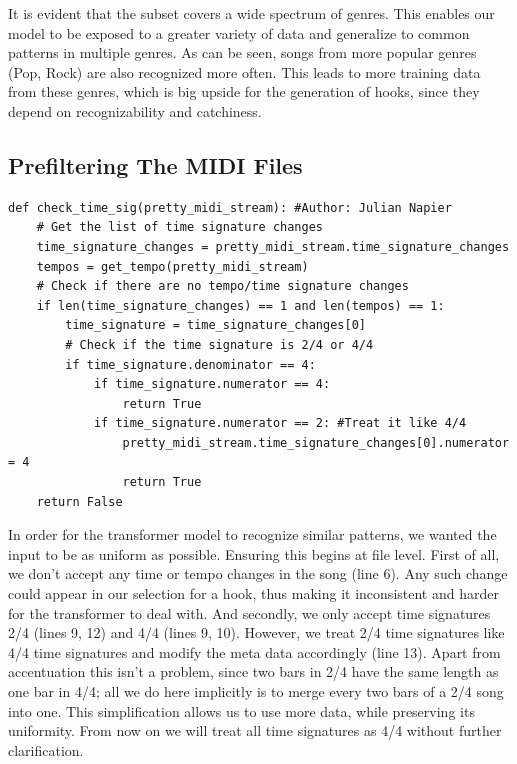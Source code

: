 \documentclass[a4paper,12pt]{extarticle}
\begin{document}
\vspace{0.1cm}
\raggedright It is evident that the subset covers a wide spectrum of genres. This enables our model to be exposed to a greater variety of data and generalize to common patterns in multiple genres. As can be seen, songs from more popular genres (Pop, Rock) are also recognized more often. This leads to more training data from these genres, which is big upside for the generation of hooks, since they depend on recognizability and catchiness.

\subsection{Prefiltering The MIDI Files}
\begin{lstlisting}
def check_time_sig(pretty_midi_stream): #Author: Julian Napier
    # Get the list of time signature changes
    time_signature_changes = pretty_midi_stream.time_signature_changes
    tempos = get_tempo(pretty_midi_stream)
    # Check if there are no tempo/time signature changes
    if len(time_signature_changes) == 1 and len(tempos) == 1:
        time_signature = time_signature_changes[0]
        # Check if the time signature is 2/4 or 4/4
        if time_signature.denominator == 4:
            if time_signature.numerator == 4:
                return True
            if time_signature.numerator == 2: #Treat it like 4/4
                pretty_midi_stream.time_signature_changes[0].numerator = 4
                return True
    return False
\end{lstlisting}
\vspace{0.2cm}
In order for the transformer model to recognize similar patterns, we wanted the input to be as uniform as possible. Ensuring this begins at file level. First of all, we don't accept any time or tempo changes in the song (line 6). Any such change could appear in our selection for a hook, thus making it inconsistent and harder for the transformer to deal with. And secondly, we only accept time signatures 2/4 (lines 9, 12) and 4/4 (lines 9, 10). However, we treat 2/4 time signatures like 4/4 time signatures and modify the meta data accordingly (line 13). Apart from accentuation this isn't a problem, since two bars in 2/4 have the same length as one bar in 4/4; all we do here implicitly is to merge every two bars of a 2/4 song into one. This simplification allows us to use more data, while preserving its uniformity. From now on we will treat all time signatures as 4/4 without further clarification.
\end{document}
